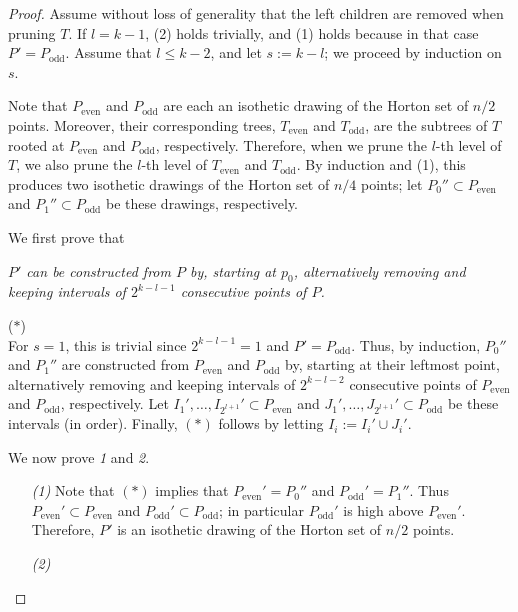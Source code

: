 \documentclass{article}
\newcommand{\MyQuote}[1]{\vspace{0.5cm}\parbox{10cm}{\em #1}\hspace*{2cm}($\ast$)\\[0.5cm]}
\begin{document}
\begin{proof}

Assume without loss of generality that the left children are removed when pruning
$T$.
If $l=k-1$, (2) holds trivially, and (1) holds because in that case $P'=P_{\textrm{odd}}$.
Assume that $l\le k-2$, and let $s:=k-l$; we proceed by induction on $s$.

Note that  $P_{\textrm{even}}$ and $P_{\textrm{odd}}$ are each an
isothetic drawing of the Horton set of $n/2$ points. Moreover, their corresponding
trees, $T_{\textrm{even}}$ and $T_{\textrm{odd}}$, are the subtrees of $T$ rooted at  $P_{\textrm{even}}$ and $P_{\textrm{odd}}$,
respectively. Therefore, when we prune the $l$-th level of $T$, we also prune the $l$-th level of $T_{\textrm{even}}$ and $T_{\textrm{odd}}$.
By induction and (1), this produces two isothetic drawings of the Horton set
of $n/4$ points; let $P_0''\subset P_{\textrm{even}} $ and $P_1'' \subset P_{\textrm{odd}} $ be these drawings, respectively.

We first prove that 

\MyQuote{$P'$ can be constructed from $P$ by, starting at $p_0$, alternatively removing
and keeping intervals of $2^{k-l-1}$ consecutive points of $P$.}

For $s=1$, this is
trivial since  $2^{k-l-1}=1$ and $P'=P_{\textrm{odd}}$. Thus, by induction,
$P_0''$ and $P_1''$ are constructed
from $P_{\textrm{even}}$ and $P_{\textrm{odd}}$ by, starting at their leftmost point,
alternatively removing and keeping intervals of $2^{k-l-2}$ consecutive
points of $P_{\textrm{even}}$ and $P_{\textrm{odd}}$, respectively. 
Let $I_1', \dots, I_{2^{l+1}}' \subset P_{\textrm{even}}$   and 
$J_1', \dots, J_{2^{l+1}}' \subset P_{\textrm{odd}}$ be these
intervals (in order). Finally, $(\ast)$ follows by letting $I_i:=I_i' \cup J_i'$.

We now prove \emph{1} and \emph{2}.
\begin{itemize}
 \item[\emph{(1)}] 
Note that $(\ast)$ implies that $P_{\textrm{even}}'=P_0''$ and $P_{\textrm{odd}}'=P_1''$.
Thus $P_{\textrm{even}}' \subset P_{\textrm{even}}$ and
$P_{\textrm{odd}}' \subset P_{\textrm{odd}}$; in particular $P_{\textrm{odd}}'$ is high above $P_{\textrm{even}}'$.
Therefore, $P'$ is an isothetic drawing of the Horton set of $n/2$ points.

\item[\emph{(2)}]


\end{itemize}
\end{proof}
\end{document}
